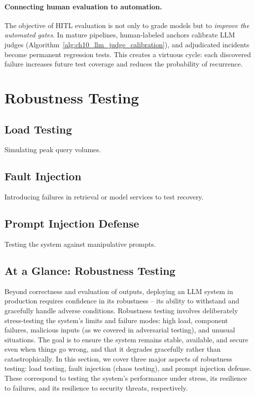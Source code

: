 \paragraph{Connecting human evaluation to automation.}
The objective of HITL evaluation is not only to grade models but to \emph{improve the automated gates}.
In mature pipelines, human-labeled anchors calibrate LLM judges (Algorithm~\ref{alg:ch10_llm_judge_calibration}), and adjudicated incidents become permanent regression tests.
This creates a virtuous cycle: each discovered failure increases future test coverage and reduces the probability of recurrence.

\section{Robustness Testing}
\label{sec:ch10-robustness-testing}

\subsection{Load Testing}
Simulating peak query volumes.

\subsection{Fault Injection}
Introducing failures in retrieval or model services to test recovery.

\subsection{Prompt Injection Defense}
Testing the system against manipulative prompts.

\subsection*{At a Glance: Robustness Testing}
Beyond correctness and evaluation of outputs, deploying an LLM system in production requires confidence in its robustness – its ability to withstand and gracefully handle adverse conditions. Robustness testing involves deliberately stress-testing the system’s limits and failure modes: high load, component failures, malicious inputs (as we covered in adversarial testing), and unusual situations. The goal is to ensure the system remains stable, available, and secure even when things go wrong, and that it degrades gracefully rather than catastrophically. In this section, we cover three major aspects of robustness testing: load testing, fault injection (chaos testing), and prompt injection defense. These correspond to testing the system’s performance under stress, its resilience to failures, and its resilience to security threats, respectively.

